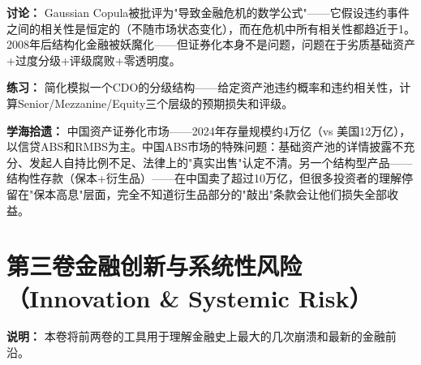 \documentclass[a4paper,11pt]{ctexart}
\begin{document}
\begin{enumerate}
\textbf{讨论：} Gaussian Copula被批评为"导致金融危机的数学公式"——它假设违约事件之间的相关性是恒定的（不随市场状态变化），而在危机中所有相关性都趋近于1。2008年后结构化金融被妖魔化——但证券化本身不是问题，问题在于劣质基础资产+过度分级+评级腐败+零透明度。

\textbf{练习：} 简化模拟一个CDO的分级结构——给定资产池违约概率和违约相关性，计算Senior/Mezzanine/Equity三个层级的预期损失和评级。

\textbf{学海拾遗：} 中国资产证券化市场——2024年存量规模约4万亿（vs 美国12万亿），以信贷ABS和RMBS为主。中国ABS市场的特殊问题：基础资产池的详情披露不充分、发起人自持比例不足、法律上的"真实出售"认定不清。另一个结构型产品——结构性存款（保本+衍生品）——在中国卖了超过10万亿，但很多投资者的理解停留在"保本高息"层面，完全不知道衍生品部分的"敲出"条款会让他们损失全部收益。

\end{enumerate}

\newpage

\section*{\textcolor{blue!70!black}{第三卷\quad 金融创新与系统性风险（Innovation \& Systemic Risk）}}

\textbf{说明：} 本卷将前两卷的工具用于理解金融史上最大的几次崩溃和最新的金融前沿。
\end{document}
